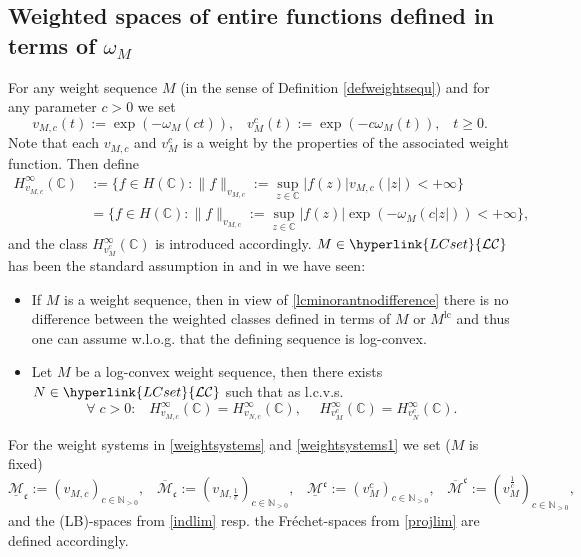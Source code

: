\documentclass[10pt]{amsart}%
\numberwithin{equation}{section}
\theoremstyle{plain}
\newcommand{\CC}{\mathbb{C}}
\newcommand{\NN}{\mathbb{N}}
\let\on=\operatorname
\begin{document}
\subsection{Weighted spaces of entire functions defined in terms of $\omega_M$}
For any weight sequence $M$ (in the sense of Definition \ref{defweightsequ}) and for any parameter $c>0$ we set
\begin{equation}\label{weights}
v_{M,c}(t):=\exp(-\omega_M(ct)),\;\;\;v^c_M(t):=\exp(-c\omega_M(t)),\;\;\;t\ge 0.
\end{equation}
Note that each $v_{M,c}$ and $v^c_M$ is a weight by the properties of the associated weight function. Then define
\begin{align*}
H^{\infty}_{v_{M,c}}(\CC)&:=\{f\in H(\CC): \|f\|_{v_{M,c}}:=\sup_{z\in\CC}|f(z)|v_{M,c}(|z|)<+\infty\}
\\&
=\{f\in H(\CC): \|f\|_{v_{M,c}}:=\sup_{z\in\CC}|f(z)|\exp(-\omega_M(c|z|))<+\infty\},
\end{align*}
and the class $H^{\infty}_{v^c_M}(\CC)$ is introduced accordingly. $M\in\hyperlink{LCset}{\mathcal{LC}}$ has been the standard assumption in \cite{solidassociatedweight} and in \cite[Rem. 2.6]{weightedentirecharacterization} we have seen:

\begin{itemize}
\item[$(*)$] If $M$ is a weight sequence, then in view of \eqref{lcminorantnodifference} there is no difference between the weighted classes defined in terms of $M$ or $M^{\on{lc}}$ and thus one can assume w.l.o.g. that the defining sequence is log-convex.

\item[$(*)$] Let $M$ be a log-convex weight sequence, then there exists $N\in\hyperlink{LCset}{\mathcal{LC}}$ such that as l.c.v.s.
$$\forall\;c>0:\;\;\;H^{\infty}_{v_{M,c}}(\CC)=H^{\infty}_{v_{N,c}}(\CC),\hspace{15pt}H^{\infty}_{v^c_M}(\CC)=H^{\infty}_{v^c_N}(\CC).$$
\end{itemize}

For the weight systems in \eqref{weightsystems} and \eqref{weightsystems1} we set ($M$ is fixed)
\begin{equation}\label{weightsequweightsystem}
\underline{\mathcal{M}}_{\mathfrak{c}}:=(v_{M,c})_{c\in\NN_{>0}},\hspace{10pt}\overline{\mathcal{M}}_{\mathfrak{c}}:=(v_{M,\frac{1}{c}})_{c\in\NN_{>0}},\hspace{10pt}\underline{\mathcal{M}}^{\mathfrak{c}}:=(v^c_M)_{c\in\NN_{>0}},\hspace{10pt}\overline{\mathcal{M}}^{\mathfrak{c}}:=(v^{\frac{1}{c}}_{M})_{c\in\NN_{>0}},
\end{equation}
and the (LB)-spaces from \eqref{indlim} resp. the Fr\'{e}chet-spaces from \eqref{projlim} are defined accordingly.
\end{document}
